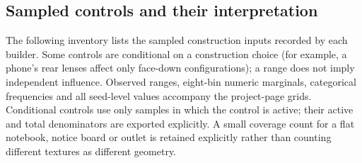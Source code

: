 \subsection{Sampled controls and their interpretation}
The following inventory lists the sampled construction inputs recorded by each builder. Some controls are conditional on a construction choice (for example, a phone's rear lenses affect only face-down configurations); a range does not imply independent influence. Observed ranges, eight-bin numeric marginals, categorical frequencies and all seed-level values accompany the project-page grids. Conditional controls use only samples in which the control is active; their active and total denominators are exported explicitly. A small coverage count for a flat notebook, notice board or outlet is retained explicitly rather than counting different textures as different geometry.
\small
